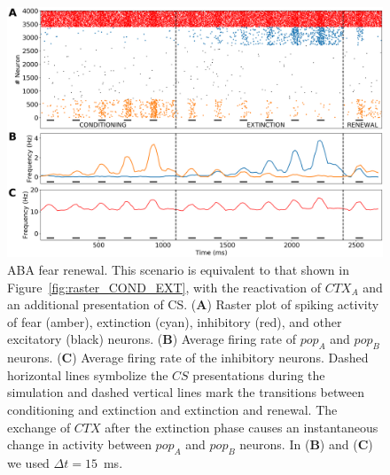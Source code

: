 \begin{figure}[!ht]
\centering
\includegraphics[width=1.0\textwidth]{figures/RENEWAL_raster.png}
\caption{\label{fig:raster_RENEWAL} ABA fear renewal. This scenario is equivalent to that shown in Figure~\ref{fig:raster_COND_EXT}, with the reactivation of $CTX_A$ and an additional presentation of CS. (\textbf{A}) Raster plot of spiking activity of fear (amber), extinction (cyan), inhibitory (red), and other excitatory (black) neurons. (\textbf{B}) Average firing rate of $pop_A$ and $pop_B$ neurons. (\textbf{C}) Average firing rate of the inhibitory neurons. Dashed horizontal lines symbolize the $CS$ presentations during the simulation and dashed vertical lines mark the transitions between conditioning and extinction and extinction and renewal. The exchange of $CTX$ after the extinction phase causes an instantaneous change in activity between $pop_A$ and $pop_B$ neurons. In (\textbf{B}) and (\textbf{C}) we used $\Delta t = 15$~ms.}
\end{figure}
\FloatBarrier

